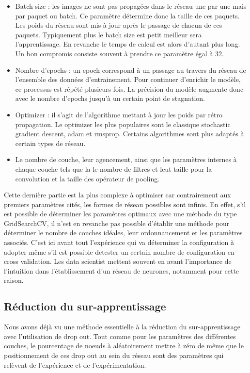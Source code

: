 \begin{itemize}
\item Batch size : les images ne sont pas propagées dans le réseau une par une mais par 
paquet ou batch. Ce paramètre détermine donc la taille de ces paquets. Les poids du réseau
sont mis à jour après le passage de chacun de ces paquets. Typiquement plus le batch size
est petit meilleur sera l'apprentissage. En revanche le temps de calcul est alors d'autant
plus long. Un bon compromis consiste souvent à prendre ce paramètre égal à 32.
\item Nombre d'epochs : un epoch correspond à un passage au travers du réseau de 
l'ensemble des données d'entrainement. Pour continuer d'enrichir le modèle, ce processus 
est répété plusieurs fois. La précision du modèle augmente donc avec le nombre d'epochs 
jusqu'à un certain point de stagnation. 
\item Optimizer : il s'agit de l'algorithme mettant à jour les poids par rétro propagation.
Le optimizer les plus populaires sont le classique stochastic gradient descent, adam et
rmsprop. Certains algorithmes sont plus adaptés à certain types de réseau. 
\item Le nombre de couche, leur agencement, ainsi que les paramètres internes 
à chaque couche tels que la le nombre de filtres et leut taille pour la convolution
et la taille des opérateur de pooling. 
\end{itemize}

Cette dernière partie est la plus complexe à optimiser car contrairement aux premiers 
paramètres cités, les formes de réseau possibles sont infinis. En effet, s'il est possible 
de déterminer les paramètres optimaux avec une méthode du type GridSearchCV, il n'est en 
revanche pas possible d'établir une méthode pour déterminer le nombre de couches idéales, 
leur ordonnancement et les paramètres associés. C'est ici avant tout l'expérience qui va 
déterminer la configuration à adopter même s'il est possible detester un certain nombre de
configuration en cross validation. Les data scientist mettent souvent en avant l'importance
de l'intuition dans l'établissement d'un réseau de neurones, notamment pour cette raison.

\subsection{Réduction du sur-apprentissage}

Nous avons déjà vu une méthode essentielle à la réduction du sur-apprentissage avec 
l'utilisation de drop out. Tout comme pour les paramètres des différentes couches, le 
pourcentage de noeuds à aléatoirement mettre à zéro de même que le positionnement de ces
drop out au sein du réseau sont des paramètres qui relèvent de l'expérience et de 
l'expérimentation. 

